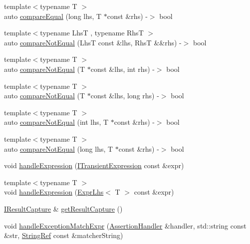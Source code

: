 \begin{DoxyCompactItemize}
\item 
{\footnotesize template$<$typename T $>$ }\\auto \mbox{\hyperlink{namespace_catch_a72f10ec2cad6db16029d48c8c1d9df2f}{compare\+Equal}} (long lhs, T $\ast$const \&rhs) -\/$>$ bool
\item 
{\footnotesize template$<$typename LhsT , typename RhsT $>$ }\\auto \mbox{\hyperlink{namespace_catch_a8bec217f5ef5f09c17074c311c958f3c}{compare\+Not\+Equal}} (LhsT const \&lhs, RhsT \&\&rhs) -\/$>$ bool
\item 
{\footnotesize template$<$typename T $>$ }\\auto \mbox{\hyperlink{namespace_catch_aa81c95898f22dce1f61d7710e495d1ee}{compare\+Not\+Equal}} (T $\ast$const \&lhs, int rhs) -\/$>$ bool
\item 
{\footnotesize template$<$typename T $>$ }\\auto \mbox{\hyperlink{namespace_catch_adad6539b3780b9a8953221efd038e2e4}{compare\+Not\+Equal}} (T $\ast$const \&lhs, long rhs) -\/$>$ bool
\item 
{\footnotesize template$<$typename T $>$ }\\auto \mbox{\hyperlink{namespace_catch_adb4b3e912b89a987025ca28cf0c92ba8}{compare\+Not\+Equal}} (int lhs, T $\ast$const \&rhs) -\/$>$ bool
\item 
{\footnotesize template$<$typename T $>$ }\\auto \mbox{\hyperlink{namespace_catch_a3db634a0adf44a1148767ba149ccf34d}{compare\+Not\+Equal}} (long lhs, T $\ast$const \&rhs) -\/$>$ bool
\item 
void \mbox{\hyperlink{namespace_catch_a65af25091f2ab61056e166765963e525}{handle\+Expression}} (\mbox{\hyperlink{struct_catch_1_1_i_transient_expression}{I\+Transient\+Expression}} const \&expr)
\item 
{\footnotesize template$<$typename T $>$ }\\void \mbox{\hyperlink{namespace_catch_af2c93db76668a981e75ae835699efce7}{handle\+Expression}} (\mbox{\hyperlink{class_catch_1_1_expr_lhs}{Expr\+Lhs}}$<$ T $>$ const \&expr)
\item 
\mbox{\hyperlink{struct_catch_1_1_i_result_capture}{I\+Result\+Capture}} \& \mbox{\hyperlink{namespace_catch_aff60c1de6ac6cea30175d70e33d83c8e}{get\+Result\+Capture}} ()
\item 
void \mbox{\hyperlink{namespace_catch_aea6f8ff3b3838829d4a61694e4bc41ca}{handle\+Exception\+Match\+Expr}} (\mbox{\hyperlink{class_catch_1_1_assertion_handler}{Assertion\+Handler}} \&handler, std\+::string const \&str, \mbox{\hyperlink{class_catch_1_1_string_ref}{String\+Ref}} const \&matcher\+String)

\end{DoxyCompactItemize}
